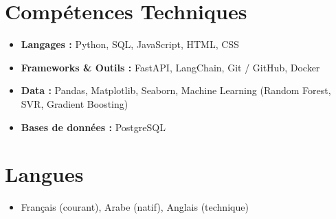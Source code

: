\documentclass[a4paper,11pt]{article}
\begin{document}
\section*{Compétences Techniques}
\begin{itemize}[leftmargin=*, noitemsep]
    \item \textbf{Langages :} Python, SQL, JavaScript, HTML, CSS
    \item \textbf{Frameworks \& Outils :} FastAPI, LangChain, Git / GitHub, Docker
    \item \textbf{Data :} Pandas, Matplotlib, Seaborn, Machine Learning (Random Forest, SVR, Gradient Boosting)
    \item \textbf{Bases de données :} PostgreSQL
\end{itemize}

\section*{Langues}
\begin{itemize}[leftmargin=*, noitemsep]
    \item Français (courant), Arabe (natif), Anglais (technique)
\end{itemize}
\end{document}
